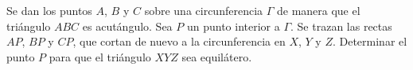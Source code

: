 Se dan los puntos $A$, $B$ y $C$ sobre una circunferencia $\Gamma$ de manera que el triángulo $ABC$ es acutángulo. Sea $P$ un punto interior a $\Gamma$. Se trazan las rectas $AP$, $BP$ y $CP$, que cortan de nuevo a la circunferencia en $X$, $Y$ y $Z$. Determinar el punto $P$ para que el triángulo $XYZ$ sea equilátero. 